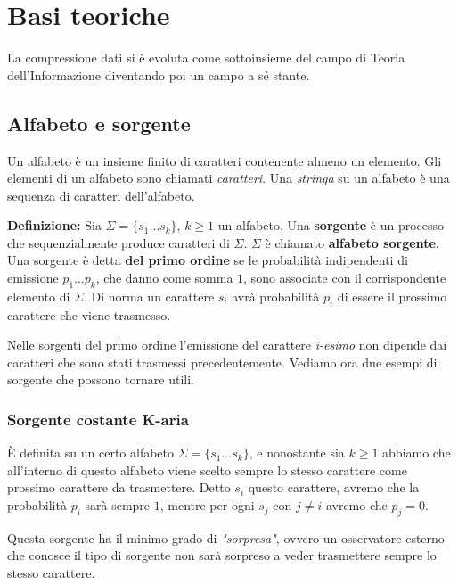 \chapter{Basi teoriche}
La compressione dati si è evoluta come sottoinsieme del campo di Teoria dell'Informazione diventando poi un campo a sé stante.

\section{Alfabeto e sorgente}
Un alfabeto è un insieme finito di caratteri contenente almeno un elemento. Gli elementi di un alfabeto sono chiamati \textit{caratteri}. Una \textit{stringa} su un alfabeto è una sequenza di caratteri dell'alfabeto.

\vspace{5mm}

\textbf{Definizione:} Sia \(\Sigma = \{s_{1} \dots s_{k}\}\), \(k \geq 1\) un alfabeto. Una \textbf{sorgente} è un processo che sequenzialmente produce caratteri di \(\Sigma\). \(\Sigma\) è chiamato \textbf{alfabeto sorgente}. Una sorgente è detta \textbf{del primo ordine} se le probabilità indipendenti di emissione \(p_1 \dots p_k\), che danno come somma \(1\), sono associate con il corrispondente elemento di \(\Sigma\). Di norma un carattere \(s_i\) avrà probabilità \(p_i\) di essere il prossimo carattere che viene trasmesso.

\vspace{5mm}

Nelle sorgenti del primo ordine l'emissione del carattere \textit{i-esimo} non dipende dai caratteri che sono stati trasmessi precedentemente. Vediamo ora due esempi di sorgente che possono tornare utili.

\subsection{Sorgente costante K-aria}
È definita su un certo alfabeto \(\Sigma = \{s_{1} \dots s_{k}\}\), e nonostante sia \(k \geq 1\) abbiamo che all'interno di questo alfabeto viene scelto sempre lo stesso carattere come prossimo carattere da trasmettere. Detto \(s_i\) questo carattere, avremo che la probabilità \(p_i\) sarà sempre \(1\), mentre per ogni \(s_j\) con \(j \neq i\) avremo che \(p_j = 0\).

Questa sorgente ha il minimo grado di \textit{"sorpresa"}, ovvero un osservatore esterno che conosce il tipo di sorgente non sarà sorpreso a veder trasmettere sempre lo stesso carattere.

